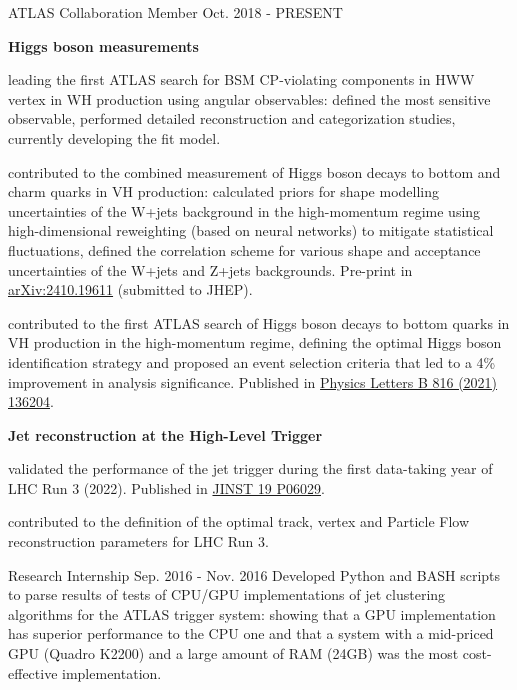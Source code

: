\begin{cventries}
    \cventry
    {ATLAS Collaboration}
    {Member}
    {}
    {Oct. 2018 - PRESENT}
    {
        \textbf{Higgs boson measurements}\vspace{14pt}
        \begin{cvitems}
            \item {leading the first ATLAS search for BSM CP-violating components in HWW vertex in WH production using angular observables: defined the most sensitive observable, performed detailed reconstruction and categorization studies, currently developing the fit model.}
            \item {contributed to the combined measurement of Higgs boson decays to bottom and charm quarks in VH production: calculated priors for shape modelling uncertainties of the W+jets background in the high-momentum regime using high-dimensional reweighting (based on neural networks) to mitigate statistical fluctuations, defined the correlation scheme for various shape and acceptance uncertainties of the W+jets and Z+jets backgrounds. Pre-print in \href{https://arxiv.org/abs/2410.19611}{arXiv:2410.19611} (submitted to JHEP).}
            \item {contributed to the first ATLAS search of Higgs boson decays to bottom quarks in VH production in the high-momentum regime, defining the optimal Higgs boson identification strategy and proposed an event selection criteria that led to a 4\% improvement in analysis significance. Published in \href{https://doi.org/10.1016/j.physletb.2021.136204}{Physics Letters B 816 (2021) 136204}.}
        \end{cvitems}\vspace{19pt}
        \textbf{Jet reconstruction at the High-Level Trigger}\vspace{14pt}
        \begin{cvitems}
            \item {validated the performance of the jet trigger during the first data-taking year of LHC Run 3 (2022). Published in \href{https://doi.org/10.1088/1748-0221/19/06/P06029}{JINST 19 P06029}.}
            \item {contributed to the definition of the optimal track, vertex and Particle Flow reconstruction parameters for LHC Run 3.}
        \end{cvitems}
    }

    {Research Internship}
    {}
    {Sep. 2016 - Nov. 2016}
    {Developed Python and BASH scripts to parse results of tests of CPU/GPU implementations of jet clustering algorithms for the ATLAS trigger system: showing that a GPU implementation has superior performance to the CPU one and that a system with a mid-priced GPU (Quadro K2200) and a large amount of RAM (24GB) was the most cost-effective implementation.}


\end{cventries}
